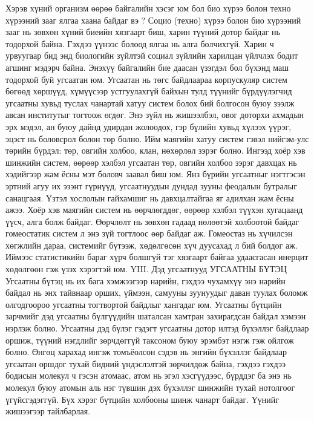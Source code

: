 Хэрэв хүний организм өөрөө байгалийн хэсэг юм бол био хүрээ болон техно хүрээний зааг ялгаа хаана байдаг вэ ? Социо (техно) хүрээ болон био хүрээний зааг нь зөвхөн хүний биеийн хязгаарт биш, харин түүний дотор байдаг нь тодорхой байна. Гэхдээ үүнээс болоод ялгаа нь алга болчихгүй. Харин ч урвуугаар бид энд биологийн зүйлтэй социал зүйлийн харилцан үйлчлэх бодит агшинг мэдэрч байна. Энэхүү байгалийн бие даасан үзэгдэл бол бүхэнд маш тодорхой буй угсаатан юм.
Угсаатан нь төгс байдлаараа корпускуляр систем бөгөөд хөршүүд, хүмүүсээр устгуулахгүй байхын тулд түүнийг бүрдүүлэгчид угсаатны хувьд туслах чанартай хатуу систем болох бий болгосон буюу зээлж авсан институтыг тогтоож өгдөг. Энэ зүйл нь жишээлбэл, овог доторхи ахмадын эрх мэдэл, ан буюу дайнд удирдан жолоодох, гэр бүлийн хувьд хүлээх үүрэг, эцэст нь боловсрол болон төр болно. Ийм маягийн хатуу систем гэвэл нийгэм-улс төрийн бүрдэл: төр, овгийн холбоо, клан, нөхөрлөл зэрэг болно. Ингээд хоёр хэв шинжийн систем, өөрөөр хэлбэл угсаатан төр, овгийн холбоо зэрэг давхцах нь хэдийгээр жам ёсны мэт боловч заавал биш юм. Янз бүрийн угсаатныг нэгтгэсэн эртний агуу их эзэнт гүрнүүд, угсаатнуудын дундад зууны феодалын бутралыг санацгаая. Үзтэл хослолын гайхамшиг нь давхцалтайгаа яг адилхан жам ёсны ажээ. Хоёр хэв маягийн систем нь өөрчлөгддөг, өөрөөр хэлбэл түүхэн хугацаанд үүсч, алга болж байдаг. Өөрчлөлт нь зөвхөн гадаад нөлөөтэй холбоотой байдаг гомеостатик систем л энэ зүй тогтлоос өөр байдаг аж. Гомеостаз нь хүчилсэн хөгжлийн дараа, системийг бүтээж, хөдөлгөсөн хүч дуусахад л бий болдог аж. Иймээс статистикийн бараг хүрч болшгүй тэг хязгаарт байгаа удаасгасан инерцит хөдөлгөөн гэж үзэх хэрэгтэй юм.
YIII. Дэд угсаатнууд
УГСААТНЫ БҮТЭЦ
Угсаатны бүтэц нь их бага хэмжээгээр нарийн, гэхдээ чухамхүү энэ нарийн байдал нь энх тайвнаар орших, үймээн, самууны зуунуудыг даван туулах боломж олгодгоороо угсаатны тогтвортой байдлыг хангадаг юм. Угсаатны бүтцийн зарчмийг дэд угсаатны бүлгүүдийн шаталсан хамтран захирагдсан байдал хэмээн нэрлэж болно. Угсаатны дэд бүлэг гэдэгт угсаатны дотор илтэд бүхэллэг байдлаар оршиж, түүний нэгдлийг зөрчдөггүй таксоном буюу эрэмбэт нэгж гэж ойлгож болно. Өнгөц харахад ингэж томъёолсон сэдэв нь энгийн бүхэллэг байдлаар угсаатан оршдог тухай бидний үндэслэлтэй зөрчилдөж байна, гэхдээ гэхдээ бодисын молекул ч гэсэн атомаас, атом нь эгэл хэсгүүдээс, бүрддэг ба энэ нь молекул буюу атомын аль нэг түвшин дэх бүхэллэг шинжийн тухай нотолгоог үгүйсгэдэггүй. Бүх хэрэг бүтцийн холбооны шинж чанарт байдаг. Үүнийг жишээгээр тайлбарлая.

